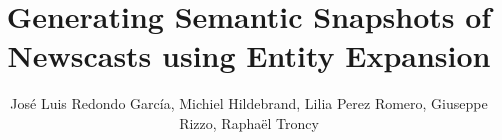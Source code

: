 \documentclass{llncs}
\begin{document}
\frontmatter          %
\pagestyle{headings}  %
\mainmatter              %

\title{Generating Semantic Snapshots of Newscasts using Entity Expansion}
\author{Jos\'e Luis Redondo Garc\'ia, Michiel Hildebrand, Lilia Perez Romero, Giuseppe Rizzo, Rapha\"el Troncy}

\maketitle              %

\end{document}

